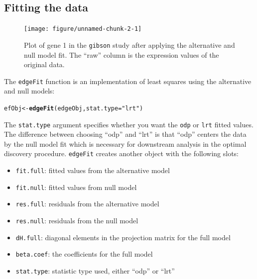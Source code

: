 \documentclass{article}\usepackage[]{graphicx}\usepackage[]{color}
\makeatletter
\newcommand{\hlstr}[1]{\textcolor[rgb]{0.192,0.494,0.8}{#1}}%
\newcommand{\hlstd}[1]{\textcolor[rgb]{0.345,0.345,0.345}{#1}}%
\newcommand{\hlkwb}[1]{\textcolor[rgb]{0.69,0.353,0.396}{#1}}%
\newcommand{\hlkwc}[1]{\textcolor[rgb]{0.333,0.667,0.333}{#1}}%
\newcommand{\hlkwd}[1]{\textcolor[rgb]{0.737,0.353,0.396}{\textbf{#1}}}%
\newenvironment{kframe}{%
 \def\at@end@of@kframe{}%
 \ifinner\ifhmode%
  \def\at@end@of@kframe{\end{minipage}}%
  \begin{minipage}{\columnwidth}%
 \fi\fi%
 \def\FrameCommand##1{\hskip\@totalleftmargin \hskip-\fboxsep
 \colorbox{shadecolor}{##1}\hskip-\fboxsep
     \hskip-\linewidth \hskip-\@totalleftmargin \hskip\columnwidth}%
 \MakeFramed {\advance\hsize-\width
   \@totalleftmargin\z@ \linewidth\hsize
   \@setminipage}}%
 {\par\unskip\endMakeFramed%
 \at@end@of@kframe}
\newenvironment{knitrout}{}{} %
\makeatother
\begin{document}
\subsection{Fitting the data}

\begin{figure}[t]
 \centering
\begin{knitrout}
\color{fgcolor}

{\centering \texttt{[image: figure/unnamed-chunk-2-1]} 

}



\end{knitrout}
\caption{Plot of gene 1 in the {\tt gibson} study after applying the alternative and null model fit. The ``raw'' column is the expression values of the original data.}
\label{fig:gplotFit}
\end{figure}

The {\tt edgeFit} function is an implementation of least squares using the alternative and null models:
\begin{knitrout}
\color{fgcolor}\begin{kframe}
\begin{alltt}
\hlstd{efObj} \hlkwb{<-} \hlkwd{edgeFit}\hlstd{(edgeObj,} \hlkwc{stat.type} \hlstd{=} \hlstr{"lrt"}\hlstd{)}
\end{alltt}
\end{kframe}
\end{knitrout}
The {\tt stat.type} argument specifies whether you want the {\tt odp} or {\tt lrt} fitted values. The difference between choosing ``odp'' and ``lrt'' is that ``odp'' centers the data by the null model fit which is necessary for downstream analysis in the optimal discovery procedure. {\tt edgeFit} creates another object with the following slots:
\begin{itemize}
\item {\tt fit.full}: fitted values from the alternative model
\item {\tt fit.null}: fitted values from null model
\item {\tt res.full}: residuals from the alternative model
\item {\tt res.null}: residuals from the null model
\item {\tt dH.full}: diagonal elements in the projection matrix for the full model
\item {\tt beta.coef}: the coefficients for the full model
\item {\tt stat.type}: statistic type used, either ``odp'' or ``lrt''
\end{itemize}
\end{document}
